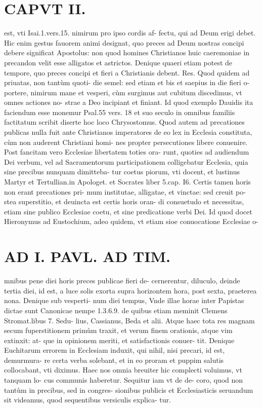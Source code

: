 \documentclass{article}
\begin{document}
\begin{pages}
\section*{CAPVT II. }
\marginpar{[ p.75 ]}\pstart est, vti Isai.1.vers.15. nimirum pro ipso cordis af- fectu, qui ad Deum erigi debet. Hic enim gestus fauorem animi designat, quo preces ad Deum nostras concipi debere significat Apostolus: non quod homines Christianos huic caeremoniae in precandon velit esse alligatos et astrictos.  \pend\pstart Denique quaeri etiam potest de tempore, quo preces concipi et fieri a Christianis debent. Res. Quod quidem ad priuatas, non tantùm quoti- die semel: sed etiam et bis et saepius in die fieri o- portere, nimirum mane et vesperi, cùm surgimus aut cubitum discedimus, vt omnes actiones no- strae a Deo incipiant et finiant. Id quod exemplo Dauidis ita faciendum esse monemur Psal.55 vers. 18 et suo seculo in omnibus familiis factitatum scribit diserte hoc loco Chrysostomus. Quod autem ad precationes publicas nulla fuit ante Christianos imperatores de eo lex in Ecclesia constituta, cùm non auderent Christiani homi- nes propter persecutiones libere conuenire. Post fancitam vero Ecclesiae libertatem toties ora- runt, quoties ad audiendum Dei verbum, vel ad Sacramentorum participationem colligebatur Ecclesia, quia sine precibus nunquam dimitteba- tur coetus piorum, vti docent, et lustinus Martyr et Tertullian.in Apologet. et Socrates liber 5.cap. I6. Certis tamen horis non erant precationes pri- mum institutae, alligatae, et vinctae: sed creuit po- stea superstitio, et deuincta est certis horis oran- di consuetudo et necessitas, etiam sine publico Ecclesiae coetu, et sine predicatione verbi Dei. Id quod docet Hieronymus ad Eustochium, adeo quidem, vt etiam sioe conuocatione Ecclesiae o-  \pend
\section*{AD I. PAVL. AD TIM. }
\marginpar{[ p.76 ]}\pstart mnibus pene diei horis preces publicae fieri de- cernerentur, diluculo, deinde tertia diei, id est, a luce solis exorta supra horizontem hora, post sexta, praeterea nona. Denique sub vesperti- num diei tempus, Vnde illae horae inter Papistas dictae sunt Canonicae nempe 1.3.6.9. de quibus etiam meminit Clemens Stromat.libus 7. Sedu- lius, Cassianus, Beda et alii. Atque haec tota res magnam secum fuperstitionem primùm traxit, et verum finem orationis, atque vim extinxit: at- que in opinionem meriti, et satisfactionis conuer- tit. Denique Euchitarum errorem in Ecclesiam induxit, qui nihil, nisi precari, id est, demurmura- re certa verba solebant, et in eo proram et puppim salutis collocabant, vti diximus. Haec nos omnia breuiter hic complecti voluimus, vt tanquam lo- cus communis haberetur. Sequitur iam vt de de- coro, quod non tantùm in precibus, sed in congres- sionibus publicis et Ecclesiasticis seruandum sit videamus, quod sequentibus versiculis explica- tur.  \pend
{}
{}

\end{pages}
\end{document}
